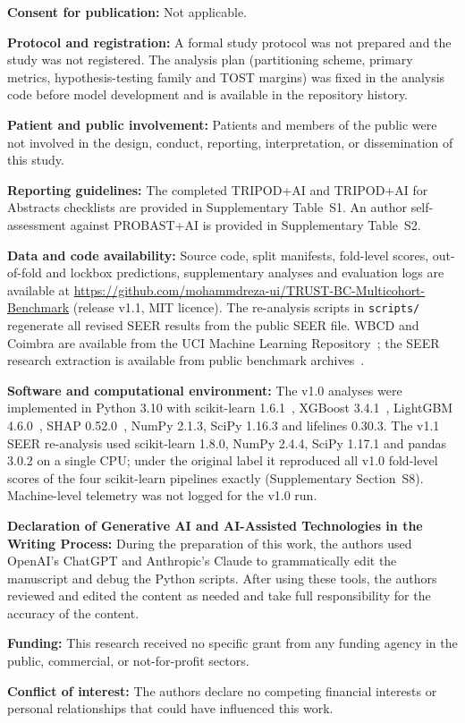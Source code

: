 \documentclass[11pt,a4paper]{article}
\begin{document}
\noindent\textbf{Consent for publication:} Not applicable.

\noindent\textbf{Protocol and registration:} A formal study protocol was not prepared and the study was not registered. The analysis plan (partitioning scheme, primary metrics, hypothesis-testing family and TOST margins) was fixed in the analysis code before model development and is available in the repository history.

\noindent\textbf{Patient and public involvement:} Patients and members of the public were not involved in the design, conduct, reporting, interpretation, or dissemination of this study.

\noindent\textbf{Reporting guidelines:} The completed TRIPOD+AI and TRIPOD+AI for Abstracts checklists are provided in Supplementary Table~S1. An author self-assessment against PROBAST+AI is provided in Supplementary Table~S2.

\noindent\textbf{Data and code availability:} Source code, split manifests, fold-level scores, out-of-fold and lockbox predictions, supplementary analyses and evaluation logs are available at \url{https://github.com/mohammdreza-ui/TRUST-BC-Multicohort-Benchmark} (release v1.1, MIT licence). The re-analysis scripts in \texttt{scripts/} regenerate all revised SEER results from the public SEER file. WBCD and Coimbra are available from the UCI Machine Learning Repository~\cite{uci}; the SEER research extraction is available from public benchmark archives~\cite{namdari2019}.

\noindent\textbf{Software and computational environment:} The v1.0 analyses were implemented in Python 3.10 with scikit-learn 1.6.1~\cite{sklearn}, XGBoost 3.4.1~\cite{xgboost}, LightGBM 4.6.0~\cite{lightgbm}, SHAP 0.52.0~\cite{lundberg2017}, NumPy 2.1.3, SciPy 1.16.3 and lifelines 0.30.3. The v1.1 SEER re-analysis used scikit-learn 1.8.0, NumPy 2.4.4, SciPy 1.17.1 and pandas 3.0.2 on a single CPU; under the original label it reproduced all v1.0 fold-level scores of the four scikit-learn pipelines exactly (Supplementary Section~S8). Machine-level telemetry was not logged for the v1.0 run.

\noindent\textbf{Declaration of Generative AI and AI-Assisted Technologies in the Writing Process:} During the preparation of this work, the authors used OpenAI's ChatGPT and Anthropic's Claude to grammatically edit the manuscript and debug the Python scripts. After using these tools, the authors reviewed and edited the content as needed and take full responsibility for the accuracy of the content.

\noindent\textbf{Funding:} This research received no specific grant from any funding agency in the public, commercial, or not-for-profit sectors.

\noindent\textbf{Conflict of interest:} The authors declare no competing financial interests or personal relationships that could have influenced this work.

\normalsize


\end{document}
